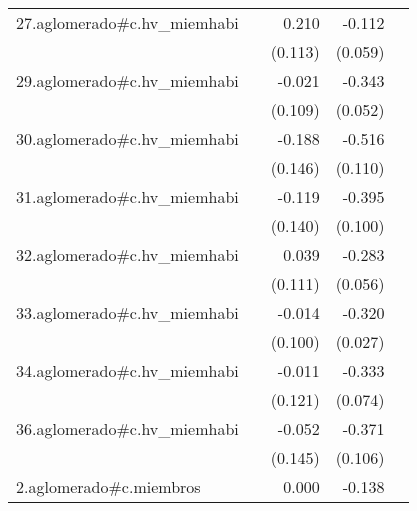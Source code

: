 {\begin{longtable}{l*{4}{D{.}{.}{-1}}}
\addlinespace
27.aglomerado#c.hv\_miemhabi&                     &       0.210         &      -0.112         &                     \\
            &                     &     (0.113)         &     (0.059)         &                     \\
\addlinespace
29.aglomerado#c.hv\_miemhabi&                     &      -0.021         &      -0.343\sym{***}&                     \\
            &                     &     (0.109)         &     (0.052)         &                     \\
\addlinespace
30.aglomerado#c.hv\_miemhabi&                     &      -0.188         &      -0.516\sym{***}&                     \\
            &                     &     (0.146)         &     (0.110)         &                     \\
\addlinespace
31.aglomerado#c.hv\_miemhabi&                     &      -0.119         &      -0.395\sym{***}&                     \\
            &                     &     (0.140)         &     (0.100)         &                     \\
\addlinespace
32.aglomerado#c.hv\_miemhabi&                     &       0.039         &      -0.283\sym{***}&                     \\
            &                     &     (0.111)         &     (0.056)         &                     \\
\addlinespace
33.aglomerado#c.hv\_miemhabi&                     &      -0.014         &      -0.320\sym{***}&                     \\
            &                     &     (0.100)         &     (0.027)         &                     \\
\addlinespace
34.aglomerado#c.hv\_miemhabi&                     &      -0.011         &      -0.333\sym{***}&                     \\
            &                     &     (0.121)         &     (0.074)         &                     \\
\addlinespace
36.aglomerado#c.hv\_miemhabi&                     &      -0.052         &      -0.371\sym{***}&                     \\
            &                     &     (0.145)         &     (0.106)         &                     \\
\addlinespace
2.aglomerado#c.miembros&                     &       0.000         &      -0.138\sym{***}&                     \\

\end{longtable}}
